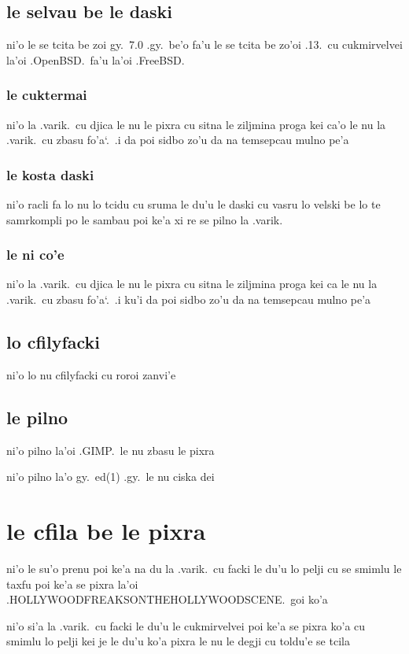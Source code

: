 \documentclass{report}
\newcommand\sds{\spacefactor\sfcode`.\ \space}
\begin{document}
\subsection{le selvau be le daski}
ni'o le se tcita be zoi gy.\ 7.0 .gy.\ be'o fa'u le se tcita be zo'oi .13.\ cu cukmirvelvei la'oi .OpenBSD.\ fa'u la'oi .FreeBSD.

\subsubsection{le cuktermai}
ni'o la .varik.\ cu djica le nu le pixra cu sitna le ziljmina proga kei ca'o le nu la .varik.\ cu zbasu fo'a\sds  .i da poi sidbo zo'u da na temsepcau mulno pe'a

\subsubsection{le kosta daski}
ni'o racli fa lo nu lo tcidu cu sruma le du'u le daski cu vasru lo velski be lo te samrkompli po le sambau poi ke'a xi re se pilno la .varik.

\subsubsection{le ni co'e}
ni'o la .varik.\ cu djica le nu le pixra cu sitna le ziljmina proga kei ca le nu la .varik.\ cu zbasu fo'a\sds  .i ku'i da poi sidbo zo'u da na temsepcau mulno pe'a

\subsection{lo cfilyfacki}
ni'o lo nu cfilyfacki cu roroi zanvi'e

\subsection{le pilno}
ni'o pilno la'oi .GIMP.\ le nu zbasu le pixra

ni'o pilno la'o gy.\ ed(1) .gy.\ le nu ciska dei

\section{le cfila be le pixra}
ni'o le su'o prenu poi ke'a na du la .varik.\ cu facki le du'u lo pelji cu se smimlu le taxfu poi ke'a se pixra la'oi .HOLLYWOODFREAKSONTHEHOLLYWOODSCENE.\ goi ko'a

ni'o si'a la .varik.\ cu facki le du'u le cukmirvelvei poi ke'a se pixra ko'a cu smimlu lo pelji kei je le du'u ko'a pixra le nu le degji cu toldu'e se tcila
\end{document}
